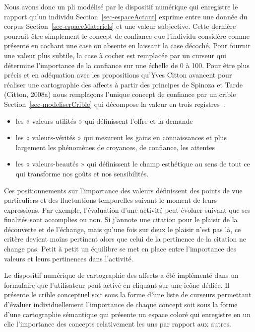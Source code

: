 \documentclass[
  a4paper,
  DIV=11,
  numbers=noendperiod]{scrreprt}
\begin{document}
Nous avons donc un pli modélisé par le dispositif numérique qui
enregistre le rapport qu'un individu Section~\ref{sec-espaceActant}
exprime entre une donnée du corpus Section~\ref{sec-espaceMateriels} et
une valeur subjective. Cette dernière pourrait être simplement le
concept de confiance que l'individu considère comme présente en cochant
une case ou absente en laissant la case décoché. Pour fournir une valeur
plus subtile, la case à cocher est remplacée par un curseur qui
détermine l'importance de la confiance sur une échelle de 0 à 100. Pour
être plus précis et en adéquation avec les propositions qu'Yves Citton
avancent pour réaliser une cartographie des affects à partir des
principes de Spinoza et Tarde (Citton, 2008a) nous remplaçons l'unique
concept de confiance par un crible Section~\ref{sec-modeliserCrible} qui
décompose la valeur en trois registres~:

\begin{itemize}
\item
  les « valeurs-utilités » qui définissent l'offre et la demande
\item
  les « valeurs-vérités » qui mesurent les gains en connaissances et
  plus largement les phénomènes de croyances, de confiance, les attentes
\item
  les « valeurs-beautés » qui définissent le champ esthétique au sens de
  tout ce qui transforme nos goûts et nos sensibilités.
\end{itemize}

Ces positionnements sur l'importance des valeurs définissent des points
de vue particuliers et des fluctuations temporelles suivant le moment de
leurs expressions. Par exemple, l'évaluation d'une activité peut évoluer
suivant que ses finalités sont accomplies ou non. Si j'annote une
citation pour le plaisir de la découverte et de l'échange, mais qu'une
fois sur deux le plaisir n'est pas là, ce critère devient moins
pertinent alors que celui de la pertinence de la citation ne change pas.
Petit à petit un équilibre se met en place entre l'importance des
valeurs et leurs pertinences dans l'activité.

Le dispositif numérique de cartographie des affects a été implémenté
dans un formulaire que l'utilisateur peut activé en cliquant sur une
icône dédiée. Il présente le crible conceptuel soit sous la forme d'une
liste de curseurs permettant d'évaluer individuellement l'importance de
chaque concept soit sous la forme d'une cartographie sémantique qui
présente un espace coloré qui enregistre en un clic l'importance des
concepts relativement les uns par rapport aux autres.
\end{document}
